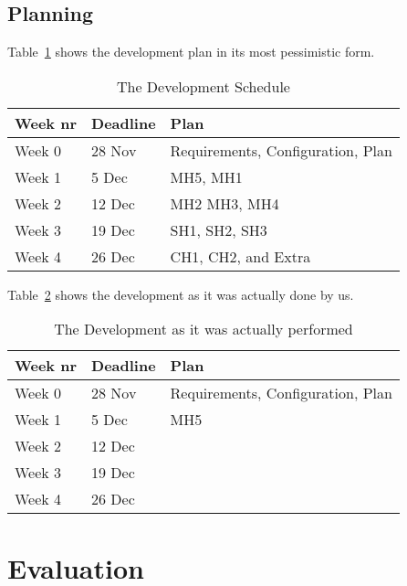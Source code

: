 \documentclass{scrartcl}
\begin{document}
\subsection{Planning}
Table~\ref{tab:plan} shows the development plan in its most pessimistic form.
\begin{table}
	\centering
	\begin{tabular}{|l|l|l|}
		\hline
		Week nr & Deadline & Plan \\\hline
		Week 0 & 28 Nov & Requirements, Configuration, Plan \\\hline
		Week 1 & 5 Dec & MH5, MH1 \\\hline
		Week 2 & 12 Dec & MH2 MH3, MH4 \\\hline
		Week 3 & 19 Dec & SH1, SH2, SH3 \\\hline
		Week 4 & 26 Dec & CH1, CH2, and Extra \\\hline
	\end{tabular}
	\caption{The Development Schedule}
	\label{tab:plan}
\end{table}

Table~\ref{tab:dev} shows the development as it was actually done by us.
\begin{table}
	\centering
	\begin{tabular}{|l|l|l|}
		\hline
		Week nr & Deadline & Plan \\\hline
		Week 0 & 28 Nov & Requirements, Configuration, Plan \\\hline
		Week 1 & 5 Dec & MH5\\\hline
		Week 2 & 12 Dec &  \\\hline
		Week 3 & 19 Dec &  \\\hline
		Week 4 & 26 Dec &  \\\hline
	\end{tabular}
	\caption{The Development as it was actually performed}
	\label{tab:dev}
\end{table}

\section{Evaluation}
\end{document}
